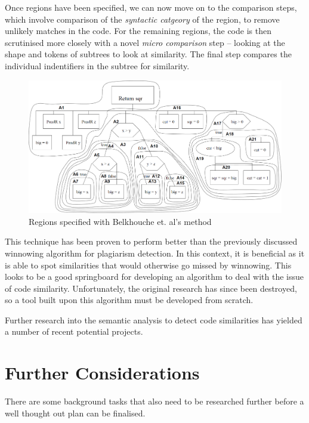Once regions have been specified, we can now move on to the comparison steps,
which involve comparison of the \emph{syntactic catgeory} of the region, to 
remove unlikely matches in the code. For the remaining regions, the code
is then scrutinised more closely with a novel \emph{micro comparison} step -- 
looking at the shape and tokens of subtrees to look at similarity. The final step
compares the individual indentifiers in the subtree for similarity.

\begin{figure}[h]
	\centering
		\includegraphics[width=\textwidth]{Figures/Belkhouche}
	\caption{Regions specified with Belkhouche et. al's method~\cite{Belkhouche}}
	\label{fig:BelkhoucheComparison}
\end{figure}

This technique has been proven to perform better than the previously discussed
winnowing algorithm for plagiarism detection. In this context, it is beneficial
as it is able to spot similarities that would otherwise go missed by winnowing.
This looks to be a good springboard for developing an algorithm to deal with
the issue of code similarity. Unfortunately,
the original research has since been destroyed, so a tool built upon this algorithm 
must be developed from scratch.

Further research into the semantic analysis to detect code similarities has yielded
a number of recent potential projects.



\section{Further Considerations}

There are some background tasks that also need to be researched further before a
well thought out plan can be finalised.

